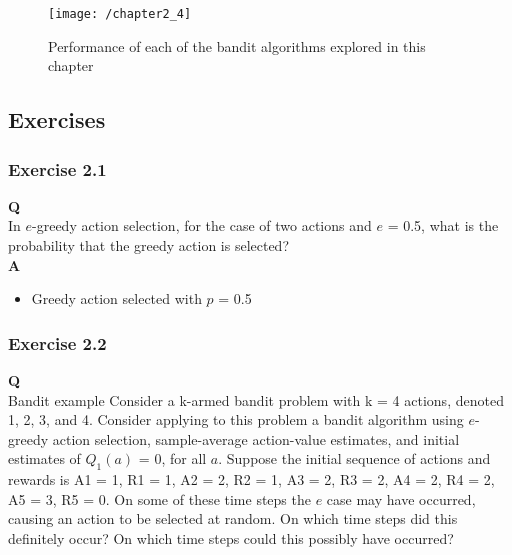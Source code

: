 \begin{figure}[h!]
	\centering
	\texttt{[image: /chapter2\_4]}
	\caption{Performance of each of the bandit algorithms explored in this chapter}
	\label{fig:chapter2_4}
\end{figure}

\subsection{Exercises}
\subsubsection{Exercise 2.1}
\textbf{Q}\\
In \(e\)-greedy action selection, for the case of two actions and \(e\) = 0.5, what is the probability that the greedy action is selected?\\

\textbf{A}\\
\begin{itemize}
	\item Greedy action selected with \(p\) = 0.5
\end{itemize}

\subsubsection{Exercise 2.2}
\textbf{Q}\\
Bandit example Consider a k-armed bandit problem with k = 4 actions, denoted 1, 2, 3, and 4. Consider applying to this problem a bandit algorithm using \(e\)-greedy action selection, sample-average action-value estimates, and initial estimates of \(Q_1(a)\) = 0, for all \(a\). Suppose the initial sequence of actions and rewards is A1 = 1, R1 = 1, A2 = 2, R2 = 1, A3 = 2, R3 = 2, A4 = 2, R4 = 2, A5 = 3, R5 = 0. On some of these time steps the \(e\) case may have occurred, causing an action to be selected at random. On which time steps did this definitely occur? On which time steps could this possibly have occurred?\\

